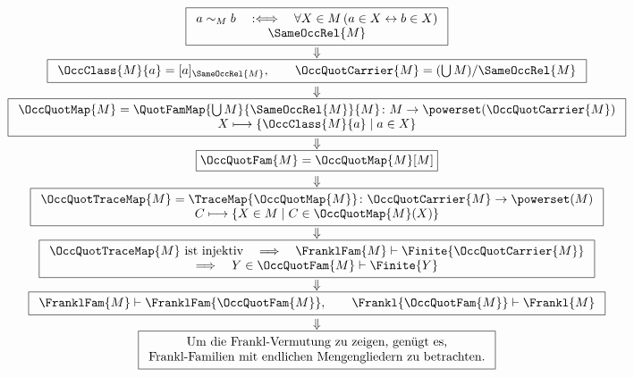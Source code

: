 \documentclass[main.tex]{subfiles}
\begin{document}
\begingroup
\footnotesize
\[
\begin{array}{@{}c@{}}
\boxed{
\begin{array}{c}
a\sim_M b
\quad:\Longleftrightarrow\quad
\forall X\in M\,(a\in X\leftrightarrow b\in X)
\\[-.1ex]
\SameOccRel{M}
\end{array}}
\\[1.1ex]
\Downarrow
\\[-.2ex]
\boxed{
\begin{array}{c}
\OccClass{M}{a}=[a]_{\SameOccRel{M}},
\qquad
\OccQuotCarrier{M}=(\bigcup M)/{\SameOccRel{M}}
\end{array}}
\\[1.1ex]
\Downarrow
\\[-.2ex]
\boxed{
\begin{array}{c}
\OccQuotMap{M}
=\QuotFamMap{\bigcup M}{\SameOccRel{M}}{M}
\colon M\to\powerset(\OccQuotCarrier{M})
\\[-.1ex]
X\longmapsto
\{\OccClass{M}{a}\mid a\in X\}
\end{array}}
\\[1.1ex]
\Downarrow
\\[-.2ex]
\boxed{
\OccQuotFam{M}=\OccQuotMap{M}[M]}
\\[1.1ex]
\Downarrow
\\[-.2ex]
\boxed{
\begin{array}{c}
\OccQuotTraceMap{M}
=\TraceMap{\OccQuotMap{M}}
\colon \OccQuotCarrier{M}\to\powerset(M)
\\[-.1ex]
C\longmapsto
\{X\in M\mid C\in\OccQuotMap{M}(X)\}
\end{array}}
\\[1.1ex]
\Downarrow
\\[-.2ex]
\boxed{
\begin{array}{c}
\OccQuotTraceMap{M}\text{ ist injektiv}
\quad\Longrightarrow\quad
\FranklFam{M}\vdash \Finite{\OccQuotCarrier{M}}
\\[-.1ex]
\Longrightarrow\quad
Y\in\OccQuotFam{M}\vdash \Finite{Y}
\end{array}}
\\[1.1ex]
\Downarrow
\\[-.2ex]
\boxed{
\begin{array}{c}
\FranklFam{M}\vdash \FranklFam{\OccQuotFam{M}},
\qquad
\Frankl{\OccQuotFam{M}}\vdash \Frankl{M}
\end{array}}
\\[1.1ex]
\Downarrow
\\[-.2ex]
\boxed{
\begin{array}{c}
\text{Um die Frankl-Vermutung zu zeigen, genügt es,}\\
\text{Frankl-Familien mit endlichen Mengengliedern zu betrachten.}
\end{array}}
\end{array}
\]
\endgroup
\end{document}
